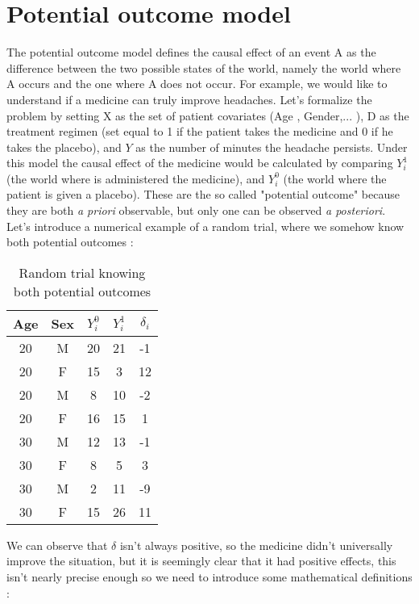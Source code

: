 \chapter{Potential outcome model}
\label{chapt:PotentialOM}
The potential outcome model defines the causal effect of an event A as the difference between the two possible states of the world, namely the world where A occurs and the one where A does not occur.
For example, we would like to understand if a medicine can truly improve headaches. Let's formalize the problem by setting X as the set of patient covariates (Age , Gender,... ), D as the treatment regimen (set equal to 1 if the patient takes the medicine and 0 if he takes the placebo), and $Y$ as the number of minutes the headache persists.
Under this model the causal effect of the medicine would be calculated by comparing $Y^{1}_i$ (the world where is administered the medicine), and  $Y^{0}_i$ (the world where the patient is given a placebo). These are the so called "potential outcome" because they are both \textit{a priori} observable, but only one can be observed \textit{a posteriori}. Let's introduce a numerical example of a random trial, where we somehow know both potential outcomes :

\begin{table}[H]
\centering
\begin{tabular}{|c|c|c|c|c|}
\hline
Age & Sex & $Y^{0}_i$ & $Y^{1}_i$ & $\delta_i$ \\ \hline
20 & M & 20 & 21 & -1  \\ \hline
20 & F & 15 & 3 & 12 \\ \hline
20 & M & 8 & 10 & -2 \\ \hline
20 & F & 16 & 15 & 1 \\ \hline
30 & M & 12 & 13 & -1 \\ \hline
30 & F & 8 & 5 & 3 \\ \hline
30 & M & 2 & 11 & -9  \\ \hline
30 & F & 15 & 26 & 11 \\ \hline
\end{tabular}
\caption{Random trial knowing both potential outcomes }
\label{rt_kbpo}
\end{table}

We can observe that $\delta$ isn't always positive, so the medicine didn't universally improve the situation, but it is seemingly clear that it had positive effects, this isn't nearly precise enough so we need to introduce some mathematical definitions :
